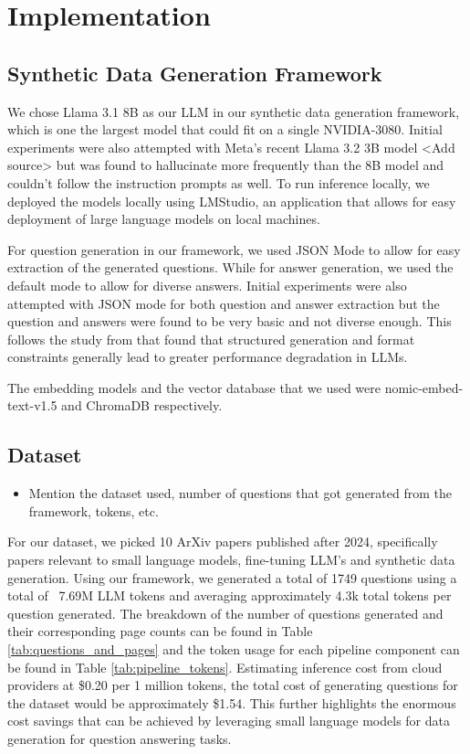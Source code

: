 \section{Implementation}\label{sec:implementation}


\subsection{Synthetic Data Generation Framework}

We chose Llama 3.1 8B as our LLM in our synthetic data generation framework, which is one the largest model that could fit on a single NVIDIA-3080. Initial experiments
were also attempted with Meta's recent Llama 3.2 3B model <Add source> but was found to hallucinate more frequently than the 8B model and couldn't follow the instruction prompts as well.
To run inference locally, we deployed the models locally using LMStudio, an application that allows for easy deployment of large language models on local machines.

For question generation in our framework, we used JSON Mode to allow for easy extraction of the generated questions. While for answer generation, we used the default
mode to allow for diverse answers. Initial experiments were also attempted with JSON mode for both question and answer extraction but the question and answers
were found to be very basic and not diverse enough. This follows the study from \cite{tam2024letspeakfreelystudy} that found that structured generation and format constraints
generally lead to greater performance degradation in LLMs.

The embedding models and the vector database that we used were nomic-embed-text-v1.5 and ChromaDB respectively.

\subsection{Dataset}

\begin{itemize}
   \item Mention the dataset used, number of questions that got generated from the framework, tokens, etc.
\end{itemize}
For our dataset, we picked 10 ArXiv papers published after 2024, specifically papers relevant to small language models, fine-tuning LLM's and synthetic data generation. 
Using our framework, we generated a total of 1749 questions using a total of ~7.69M LLM tokens and averaging approximately 4.3k total tokens per question generated. 
The breakdown of the number of questions generated and their corresponding page counts can be found in Table \ref{tab:questions_and_pages} and the token usage 
for each pipeline component can be found in Table \ref{tab:pipeline_tokens}. Estimating inference cost from cloud providers at \$0.20 per 1 million tokens, 
the total cost of generating questions for the dataset would be approximately \$1.54. This further highlights the enormous cost savings that can be achieved 
by leveraging small language models for data generation for question answering tasks.

